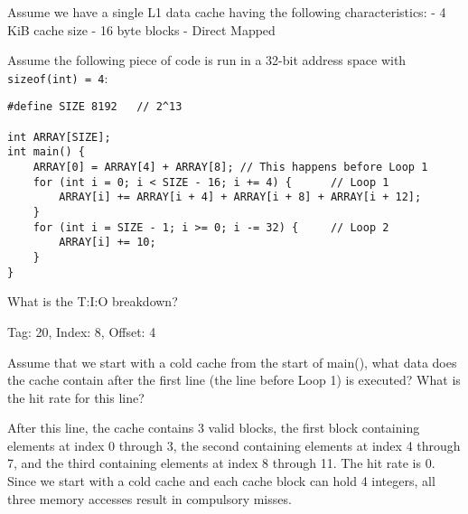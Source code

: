 \begin{blocksection}
\question
Assume we have a single L1 data cache having the following characteristics: 
- 4 KiB cache size 
- 16 byte blocks 
- Direct Mapped

Assume the following piece of code is run in a 32-bit address space with \lstinline$sizeof(int) = 4$:

\begin{verbatim}
#define SIZE 8192   // 2^13

int ARRAY[SIZE]; 
int main() {
	ARRAY[0] = ARRAY[4] + ARRAY[8]; // This happens before Loop 1
	for (int i = 0; i < SIZE - 16; i += 4) {      // Loop 1
		ARRAY[i] += ARRAY[i + 4] + ARRAY[i + 8] + ARRAY[i + 12];
	}
	for (int i = SIZE - 1; i >= 0; i -= 32) {     // Loop 2
		ARRAY[i] += 10;
	}
}
\end{verbatim}

What is the T:I:O breakdown?

\begin{solution}
Tag: 20, Index: 8, Offset: 4
\end{solution}

\question
Assume that we start with a cold cache from the start of main(), what data does the cache contain after the first line (the line before Loop 1) is executed? What is the hit rate for this line?

\begin{solution}
After this line, the cache contains 3 valid blocks, the first block containing elements at index 0 through 3, the second containing elements at index 4 through 7, and the third containing elements at index 8 through 11.
The hit rate is 0. Since we start with a cold cache and each cache block can hold 4 integers, all three memory accesses result in compulsory misses. 
\end{solution}

\end{blocksection}
